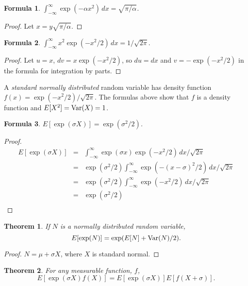 \documentclass[11pt,fleqn]{amsart}
\newcommand{\Var}{\mathop{\rm{Var}}}
\newtheorem{thm}{Theorem}[section]
\newtheorem{formula}{Formula}[section]
\begin{document}
\begin{formula}
$\displaystyle\int_{-\infty}^\infty \exp(-\alpha x^2)\,dx = \sqrt{\pi/\alpha}$.
\end{formula}
\begin{proof}
Let $x = y\sqrt{\pi/\alpha}$. 
\end{proof}

\begin{formula}
$\displaystyle\int_{-\infty}^\infty x^2\exp(-x^2/2)\,dx = 1/\sqrt{2\pi}.$
\end{formula}
\begin{proof}
Let $u = x$, $dv = x\exp(-x^2/2)$, so $du = dx$ and $v = -\exp(-x^2/2)$
in the formula for integration by parts.
\end{proof}

A {\em standard normally distributed} random variable has density function
$f(x) = \exp(-x^2/2)/\sqrt{2\pi}$. The formulas above show that $f$
is a density function and
$E[X^2] = \Var(X) = 1$.

\begin{formula}
$E[\exp(\sigma X)] = \exp(\sigma^2/2)$.
\end{formula}

\begin{proof}
\begin{eqnarray*}
E[\exp(\sigma X)]
	&=& \int_{-\infty}^\infty \exp(\sigma x)\exp(-x^2/2)\,dx/\sqrt{2\pi}\\
	&=& \exp(\sigma^2/2)
		\int_{-\infty}^\infty \exp(-(x - \sigma)^2/2)\,dx/\sqrt{2\pi}\\
	&=& \exp(\sigma^2/2)
		\int_{-\infty}^\infty \exp(-x^2/2)\,dx/\sqrt{2\pi}\\
	&=& \exp(\sigma^2/2)\\
\end{eqnarray*}
\end{proof}

\begin{thm}
If $N$ is a normally distributed random variable,
$$E[\exp(N)] = \exp(E[N] + \Var(N)/2).$$
\end{thm}

\begin{proof}
$N = \mu + \sigma X$, where $X$ is standard normal.
\end{proof}

\begin{thm}
For any measurable function, $f$, 
$$E[\exp(\sigma X) f(X)] = E[\exp(\sigma X)] E[f(X + \sigma)].$$
\end{thm}
\end{document}
